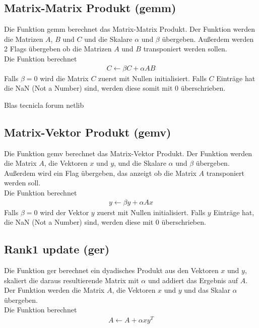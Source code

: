 \subsection{Matrix-Matrix Produkt (gemm)}
Die Funktion \glqq gemm\grqq{} berechnet das Matrix-Matrix Produkt.
Der Funktion werden die Matrizen $A$, $B$ und $C$ und die Skalare $\alpha$ und $\beta$ übergeben. Außerdem werden 2 Flags übergeben ob die Matrizen $A$ und $B$ transponiert werden sollen.\\
Die Funktion berechnet
\begin{align}
	C \leftarrow \beta  C + \alpha  A  B
\end{align}
Falls $\beta = 0$ wird die Matrix $C$ zuerst mit Nullen initialisiert. Falls $C$ Einträge hat die NaN (Not a Number) sind, werden diese somit mit 0 überschrieben.

\cite{blast}
Blas tecnicla forum netlib

\subsection{Matrix-Vektor Produkt (gemv)}
Die Funktion \glqq gemv\grqq{} berechnet das Matrix-Vektor Produkt.
Der Funktion werden die Matrix $A$, die Vektoren $x$ und $y$, und die Skalare $\alpha$ und $\beta$ übergeben. Außerdem wird ein Flag übergeben, das anzeigt ob die Matrix $A$ transponiert werden soll.\\
Die Funktion berechnet
\begin{align}
y \leftarrow \beta  y + \alpha A x 
\end{align}
Falls $\beta = 0$ wird der Vektor $y$ zuerst mit Nullen initialisiert. Falls $y$ Einträge hat, die NaN (Not a Number) sind, werden diese mit 0 überschrieben.

\subsection{Rank1 update (ger)}
Die Funktion \glqq ger\grqq{}  berechnet ein dyadisches Produkt aus den Vektoren $x$ und $y$, skaliert die daraus resultierende Matrix mit $\alpha$ und addiert das Ergebnis auf $A$.\\
Der Funktion werden die Matrix $A$, die Vektoren $x$ und $y$ und das Skalar $\alpha$ übergeben.\\
Die Funktion berechnet
\begin{align}
A \leftarrow A + \alpha  x y^T
\end{align}

